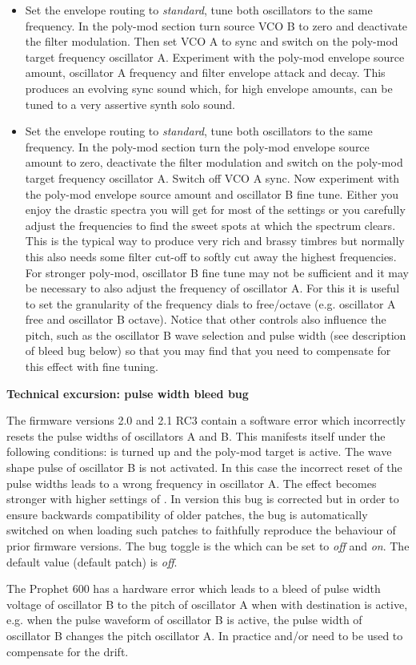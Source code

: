 \begin{itemize}
  \item Set the envelope routing to \textit{standard}, tune both oscillators to the same frequency. In the poly-mod section turn source VCO B to zero and deactivate the filter modulation. Then set VCO A to sync and switch on the poly-mod target frequency oscillator A. Experiment with the poly-mod envelope source amount, oscillator A frequency and filter envelope attack and decay. This produces an evolving sync sound which, for high envelope amounts, can be tuned to a very assertive synth solo sound.
  \item Set the envelope routing to \textit{standard}, tune both oscillators to the same frequency. In the poly-mod section turn the poly-mod envelope source amount to zero, deactivate the filter modulation  and switch on the poly-mod target frequency oscillator A. Switch off VCO A sync. Now experiment with the poly-mod envelope source amount and oscillator B fine tune. Either you enjoy the drastic spectra you will get for most of the settings or you carefully adjust the frequencies to find the sweet spots at which the spectrum clears. This is the typical way to produce very rich and brassy timbres but normally this also needs some filter cut-off to softly cut away the highest frequencies. For stronger poly-mod, oscillator B fine tune may not be sufficient and it may be necessary to also adjust the frequency of oscillator A. For this it is useful to set the granularity of the frequency dials to free/octave (e.g. oscillator A free and oscillator B octave). Notice that other controls also influence the pitch, such as the oscillator B wave selection and pulse width (see description of bleed bug below) so that you may find that you need to compensate for this effect with fine tuning.   
\end{itemize} 

\textbf{Technical excursion: pulse width bleed bug}

The firmware versions 2.0 and 2.1 RC3 contain a software error which incorrectly resets the pulse widths of oscillators A and B. This manifests itself under the following conditions: \polymodosc is turned up and the poly-mod target \polymodfreq is active. The wave shape pulse of oscillator B is not activated. In this case the incorrect reset of the pulse widths leads to a wrong frequency in oscillator A. The effect becomes stronger with higher settings of \polymodosc. In version \version this bug is corrected but in order to ensure backwards compatibility of older patches, the bug is automatically switched on when loading such patches to faithfully reproduce the behaviour of prior firmware versions.  The bug toggle is the \syncbug which can be set to \textit{off} and \textit{on}. The default value (default patch) is \textit{off}.

The Prophet 600 has a hardware error which leads to a bleed of pulse width voltage of oscillator B to the pitch of oscillator A when \polymodosc with destination \polymodfreq is active, e.g. when the pulse waveform of oscillator B is active, the pulse width of oscillator B changes the pitch oscillator A. In practice \oscfreq and/or \freqfine need to be used to compensate for the drift.   
